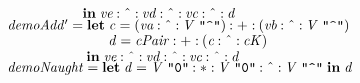 \documentclass{article}
\newcommand{\Conid}[1]{\mathit{#1}}
\newcommand{\Varid}[1]{\mathit{#1}}
\begin{document}
\begin{tabbing}
${\phantom{\Varid{demoAdd}\mathrel{=}\mbox{}}\mathbf{in}\;\Varid{ve}\mathbin{:\char94 :}\Varid{vd}\mathbin{:\char94 :}\Varid{vc}\mathbin{:\char94 :}\Varid{d}}$\\
${\Varid{demoAdd'}\mathrel{=}\mathbf{let}\;\Varid{c}\mathrel{=}(\Varid{va}\mathbin{:\char94 :}\Conid{V}\;\text{\ttfamily \char34 \char94 \char34})\mathbin{:+:}(\Varid{vb}\mathbin{:\char94 :}\Conid{V}\;\text{\ttfamily \char34 \char94 \char34})}$\\
${\phantom{\Varid{demoAdd'}\mathrel{=}\mathbf{let}\;\mbox{}}\Varid{d}\mathrel{=}\Varid{cPair}\mathbin{:+:}(\Varid{c}\mathbin{:\char94 :}\Varid{cK})}$\\
${\phantom{\Varid{demoAdd'}\mathrel{=}\mbox{}}\mathbf{in}\;\Varid{ve}\mathbin{:\char94 :}\Varid{vd}\mathbin{:\char94 :}\Varid{vc}\mathbin{:\char94 :}\Varid{d}}$\\
${}$\\
${\Varid{demoNaught}\mathrel{=}\mathbf{let}\;\Varid{d}\mathrel{=}\Conid{V}\;\text{\ttfamily \char34 0\char34}\mathbin{:*:}\Conid{V}\;\text{\ttfamily \char34 0\char34}\mathbin{:\char94 :}\Conid{V}\;\text{\ttfamily \char34 \char94 \char34}\;\mathbf{in}\;\Varid{d}}$
\end{tabbing}\iffalse
 test $ vx :^: ((va :^: cPair) :*: (vb :^: V"^"))
--demonstrates that a ^ b = a ^ cPair :*: b ^ cE
\fi
\fi
\end{document}
